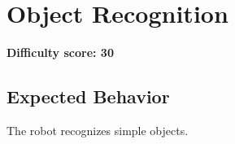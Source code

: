 \section{Object Recognition}

\textbf{Difficulty score: 30}

\subsection{Expected Behavior}
The robot recognizes simple objects.


